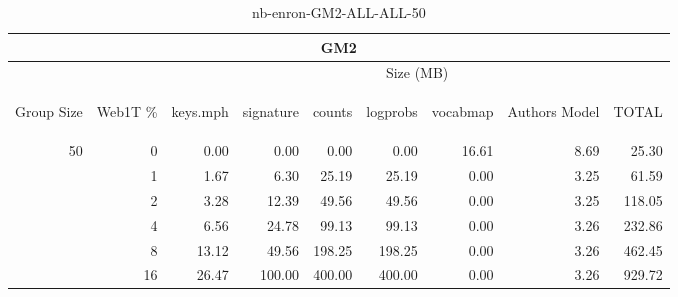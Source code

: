 \begin{center}
\begin{table}[htbp]
\begin{tabular}{ | r | r | r | r | r | r | r | r | r |}
\hline
\multicolumn{9}{|c|}{GM2}\\
\hline
 & & \multicolumn{7}{|c|}{Size (MB)}\\ \cline{3-9}
\begin{sideways}Group Size\end{sideways} & \begin{sideways}Web1T \% \end{sideways} & \begin{sideways}keys.mph\end{sideways} & \begin{sideways}signature\end{sideways} & \begin{sideways}counts\end{sideways} & \begin{sideways}logprobs\end{sideways} & \begin{sideways}vocabmap\end{sideways} & \begin{sideways}Authors Model \end{sideways} & \begin{sideways}TOTAL\end{sideways}\\
\hline
\multirow{5}{*}{50}
 & 0 & 0.00 & 0.00 & 0.00 & 0.00 & 16.61 & 8.69 & 25.30\\ \cline{2-9}
 & 1 & 1.67 & 6.30 & 25.19 & 25.19 & 0.00 & 3.25 & 61.59\\ \cline{2-9}
 & 2 & 3.28 & 12.39 & 49.56 & 49.56 & 0.00 & 3.25 & 118.05\\ \cline{2-9}
 & 4 & 6.56 & 24.78 & 99.13 & 99.13 & 0.00 & 3.26 & 232.86\\ \cline{2-9}
 & 8 & 13.12 & 49.56 & 198.25 & 198.25 & 0.00 & 3.26 & 462.45\\ \cline{2-9}
 & 16 & 26.47 & 100.00 & 400.00 & 400.00 & 0.00 & 3.26 & 929.72\\ \cline{2-9}
\hline
\end{tabular}
\caption{nb-enron-GM2-ALL-ALL-50}
\label{table:nb-enron-GM2-ALL-ALL-50}
\end{table}
\end{center}

